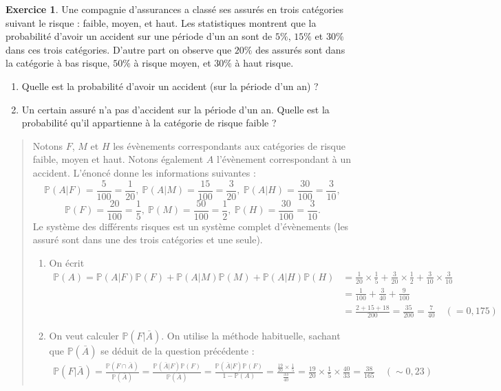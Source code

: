 \documentclass[11pt]{article}
\renewcommand{\P}{\mathbb P}
\theoremstyle{definition}
\newtheorem{exo}{Exercice}
\newenvironment{solution}{\begin{quote}\color{teal}}{\end{quote}}
\begin{document}
 \begin{exo} 
 Une compagnie d'assurances a classé ses assurés en trois catégories suivant le risque : faible, moyen, et haut. Les statistiques montrent que la probabilité d'avoir un accident sur une période d'un an sont de $5\%$, $15\%$ et $30\%$ dans ces trois catégories. D'autre part on observe que $20\%$ des assurés sont dans la catégorie à bas risque, $50\%$ à risque moyen, et $30\%$ à haut risque.
 \begin{enumerate}
 \item Quelle est la probabilité d'avoir un accident (sur la période d'un an) ? 
 \item Un certain assuré n'a pas d'accident sur la période d'un an. Quelle est la probabilité qu'il appartienne à la catégorie de risque faible ?
 \end{enumerate}
 
 \begin{solution}
 Notons $F$, $M$ et $H$ les évènements correspondants aux catégories de risque faible, moyen et haut. Notons également $A$ l'évènement correspondant à un accident.
 L'énoncé donne les informations suivantes :
 \[
 \P(A|F) = \frac{5}{100}=\frac{1}{20}, \:
 \P(A|M) = \frac{15}{100}=\frac{3}{20}, \:
 \P(A|H)=\frac{30}{100}=\frac{3}{10},
 \]
 \[
 \P(F)=\frac{20}{100}=\frac{1}{5},\:
 \P(M)=\frac{50}{100} =\frac{1}{2},\:
 \P(H)=\frac{30}{100}=\frac{3}{10}.
 \]
 Le système des différents risques est un système complet d'évènements (les assuré sont dans une des trois catégories et une seule).
\begin{enumerate}
\item On écrit
\begin{align*}
\P(A)
= \P(A|F)\P(F) + \P(A|M)\P(M)+\P(A|H)\P(H)
&= \frac{1}{20}\times\frac{1}{5} + \frac{3}{20}\times\frac{1}{2}+\frac{3}{10}\times\frac{3}{10}\\
&= \frac{1}{100}+\frac{3}{40}+\frac{9}{100}\\
&= \frac{2+15+18}{200} = \frac{35}{200}=\boxed{\frac{7}{40}} \quad (=0,175)
\end{align*}
\item On veut calculer $\P(F|\bar A)$. On utilise la méthode habituelle, sachant que $\P(\bar A)$ se déduit de la question précédente :
\begin{align*}
\P(F|\bar A) = \frac{\P(F\cap \bar A)}{\P(\bar A)} 
= \frac{\P(\bar A | F)\P(F)}{\P(\bar A)}
= \frac{\P(\bar A | F)\P(F)}{1-\P(A)}
=\frac{\frac{19}{20}\times\frac{1}{5}}{\frac{33}{40}}
= \frac{19}{20}\times\frac{1}{5}\times\frac{40}{33}=\boxed{\frac{38}{165}} \quad (\sim 0,23)
\end{align*}
\end{enumerate}
\end{solution}
 \end{exo}
\end{document}
